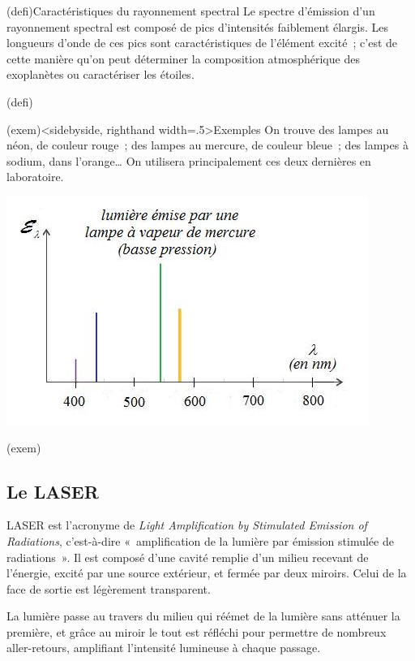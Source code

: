 \documentclass[../../main/main.tex]{subfiles}
\begin{document}
\begin{tcb}(defi){Caractéristiques du rayonnement spectral}
	Le spectre d'émission d'un rayonnement spectral est composé de pics
	d'intensités faiblement élargis. Les longueurs d'onde de ces pics sont
	caractéristiques de l'élément excité~; c'est de cette manière qu'on peut
	déterminer la composition atmosphérique des exoplanètes ou caractériser les
	étoiles.
\end{tcb}(defi)
\begin{tcb}(exem)<sidebyside, righthand width=.5\linewidth>{Exemples}
	On trouve des lampes au néon, de couleur rouge~; des lampes au mercure, de
	couleur bleue~; des lampes à sodium, dans l'orange… On utilisera
	principalement ces deux dernières en laboratoire.
	\tcblower
	\begin{center}
		\includegraphics[width=.9\linewidth]{ch1_fig3.jpg}
		\label{fig:lamp_spec}
	\end{center}
\end{tcb}(exem)

\subsection{Le LASER}
LASER est l'acronyme de \textit{Light Amplification by Stimulated Emission of
	Radiations}, c'est-à-dire «~amplification de la lumière par émission stimulée de
radiations~». Il est composé d'une cavité remplie d'un milieu recevant de
l'énergie, excité par une source extérieur, et fermée par deux miroirs. Celui de
la face de sortie est légèrement transparent.

La lumière passe au travers du milieu qui réémet de la lumière sans atténuer la
première, et grâce au miroir le tout est réfléchi pour permettre de nombreux
aller-retours, amplifiant l'intensité lumineuse à chaque passage.
\end{document}
